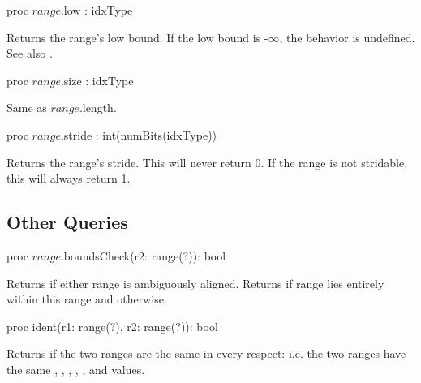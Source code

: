 \begin{protohead}
proc $range$.low : idxType
\end{protohead}
\begin{protobody}
Returns the range's low bound.
If the low bound is -$\infty$, the behavior is undefined.
See also .
\end{protobody}

\begin{protohead}
proc $range$.size : idxType
\end{protohead}
\begin{protobody}
Same as $range$.length.
\end{protobody}

\begin{protohead}
proc $range$.stride : int(numBits(idxType))
\end{protohead}
\begin{protobody}
Returns the range's stride. This will never return 0.
If the range is not stridable, this will always return 1.
\end{protobody}

\subsection{Other Queries}
\label{Range_Queries}

\begin{protohead}
proc $range$.boundsCheck(r2: range(?)): bool
\end{protohead}
\begin{protobody}
Returns  if either range is ambiguously aligned.
Returns  if range  lies entirely within this range
and  otherwise.  
\end{protobody}

\begin{protohead}
proc ident(r1: range(?), r2: range(?)): bool
\end{protohead}
\begin{protobody}
Returns  if the two ranges are the same in every respect: i.e. the
two ranges have the same ,
, , , ,  and
 values.
\end{protobody}

